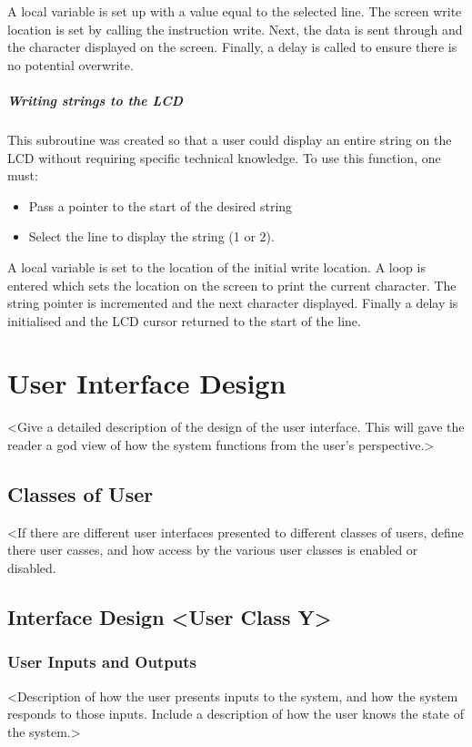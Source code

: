 \documentclass[]{report}
\begin{document}
A local variable is set up with a value equal to the selected line. The screen write location is set by calling the instruction write. Next, the data is sent through and the character displayed on the screen. Finally, a delay is called to ensure there is no potential overwrite.

\paragraph{Writing strings to the LCD}
This subroutine was created so that a user could display an entire string on the LCD without requiring specific technical knowledge. To use this function, one must:
\begin{itemize}
\item Pass a pointer to the start of the desired string
\item Select the line to display the string (1 or 2).
\end{itemize}

A local variable is set to the location of the initial write location. A loop is entered which sets the location on the screen to print the current character. The string pointer is incremented and the next character displayed. Finally a delay is initialised and the LCD cursor returned to the start of the line.

\chapter{User Interface Design}
<Give a detailed description of the design of the user interface. This will gave the reader a god view of how the system functions from the user's perspective.>

\section{Classes of User}
<If there are different user interfaces presented to different classes of users, define there user casses, and how access by the various user classes is enabled or disabled.

\section{Interface Design <User Class Y>}
\subsection{User Inputs and Outputs}
<Description of how the user presents inputs to the system, and how the system responds to those inputs. Include a description of how the user knows the state of the system.>
\end{document}

